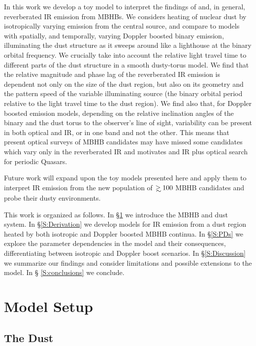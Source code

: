 In this work we develop a toy model to interpret the findings of \cite{Jun:2015} and, in
general, reverberated IR emission from MBHBs. We considers heating of nuclear
dust by isotropically varying emission from the central source, and compare to
models with spatially, and temporally, varying Doppler boosted binary
emission, illuminating the dust structure as it sweeps around like a
lighthouse at the binary orbital frequency. We crucially take into account the
relative light travel time to different parts of the dust structure in a
smooth dusty-torus model. We find that the relative magnitude and phase lag of
the reverberated IR emission is dependent not only on the size of the dust
region, but also on its geometry and the pattern speed of the variable
illuminating source (the binary orbital period relative to the light travel
time to the dust region). We find also that, for Doppler boosted emission
models, depending on the relative inclination angles of the binary and the
dust torus to the observer's line of sight, variability can be present in both
optical and IR, or in one band and not the other. This means that present
optical surveys of MBHB candidates may have missed some candidates which vary
only in the reverberated IR and motivates and IR plus optical search for
periodic Quasars.


Future work will expand upon the toy models presented here and apply them to
interpret IR emission from the new population of $\gsim100$ MBHB
candidates \citep{Graham+2015b, Charisi+2016} and probe their dusty
environments.



This work is organized as follows. In \S \ref{S:Model} we introduce the MBHB
and dust system. In \S \ref{S:Derivation} we develop models for IR emission
from a dust region heated by both isotropic and Doppler boosted MBHB
continua. In \S \ref{S:PDs} we explore the parameter dependencies in the
model and their consequences, differentiating between isotropic and Doppler
boost scenarios.  In \S \ref{S:Discussion} we summarize our findings and
consider limitations and possible extensions to the model. In \S
\ref{S:conclusions} we conclude.




\section{Model Setup}
 \label{S:Model}
 \subsection{The Dust}

